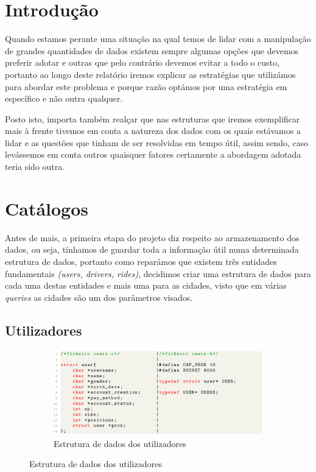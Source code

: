 \documentclass[12pt,a4paper]{report}
\begin{document}
\chapter{Introdução}

Quando estamos perante uma situação na qual temos de lidar com a manipulação de grandes quantidades de dados existem sempre algumas opções que devemos preferir adotar e outras que pelo contrário devemos evitar a todo o custo, portanto ao longo deste relatório iremos explicar as estratégias que utilizámos para abordar este problema e porque razão optámos por uma estratégia em específico e não outra qualquer.

Posto isto, importa também realçar que nas estruturas que iremos exemplificar mais à frente tivemos em conta a natureza dos dados com os quais estávamos a lidar e as questões que tinham de ser resolvidas em tempo útil, assim sendo, caso levássemos em conta outros quaisquer fatores certamente a abordagem adotada teria sido outra.

\chapter{Catálogos}

Antes de mais, a primeira etapa do projeto diz respeito ao armazenamento dos dados, ou seja, tínhamos de guardar toda a informação útil numa determinada estrutura de dados, portanto como reparámos que existem três entidades fundamentais \textit{(users, drivers, rides)}, decidimos criar uma estrutura de dados para cada uma destas entidades e mais uma para as cidades, visto que em várias \textit{queries} as cidades são um dos parâmetros visados.

\section{Utilizadores}

\begin{figure}[h]
    \centering
    \begin{subfigure}{\textwidth}
        \centering
        \includegraphics[width=1\linewidth]{images/users.png}
        \caption*{Estrutura de dados dos utilizadores}
        \label{fig:users}
    \end{subfigure}
\end{figure}
\end{document}
